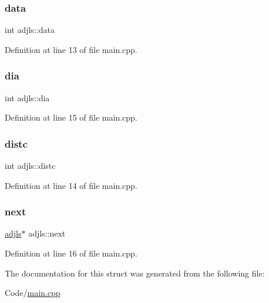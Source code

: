 \subsubsection{\texorpdfstring{data}{data}}
{\footnotesize\ttfamily int adjls\+::data}



Definition at line 13 of file main.\+cpp.

\mbox{\label{structadjls_a9926ef0452fbfe40ec2d12ab41cf7e54}} 
\subsubsection{\texorpdfstring{dia}{dia}}
{\footnotesize\ttfamily int adjls\+::dia}



Definition at line 15 of file main.\+cpp.

\mbox{\label{structadjls_a5436743f742db03491ad4b1a0e5a49a8}} 
\subsubsection{\texorpdfstring{distc}{distc}}
{\footnotesize\ttfamily int adjls\+::distc}



Definition at line 14 of file main.\+cpp.

\mbox{\label{structadjls_a5887ecb5fe66ccfbbb6748b6cd411259}} 
\subsubsection{\texorpdfstring{next}{next}}
{\footnotesize\ttfamily \hyperlink{structadjls}{adjls}$\ast$ adjls\+::next}



Definition at line 16 of file main.\+cpp.



The documentation for this struct was generated from the following file\+:\begin{DoxyCompactItemize}
\item 
Code/\hyperlink{main_8cpp}{main.\+cpp}\end{DoxyCompactItemize}
